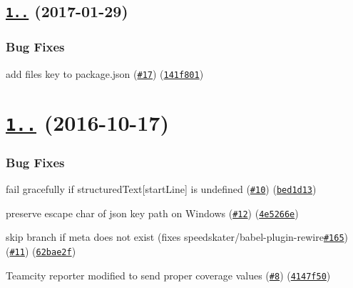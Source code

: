 \label{_1.0.1}%
 \subsection*{\href{https://github.com/istanbuljs/istanbul-reports/compare/v1.0.0...v1.0.1}{\tt 1..} (2017-\/01-\/29)}

\subsubsection*{Bug Fixes}


\begin{DoxyItemize}
\item add files key to package.\+json (\href{https://github.com/istanbuljs/istanbul-reports/issues/17}{\tt \#17}) (\href{https://github.com/istanbuljs/istanbul-reports/commit/141f801}{\tt 141f801})
\end{DoxyItemize}

\label{_1.0.0}%
 \section*{\href{https://github.com/istanbuljs/istanbul-reports/compare/v1.0.0-alpha.8...v1.0.0}{\tt 1..} (2016-\/10-\/17)}

\subsubsection*{Bug Fixes}


\begin{DoxyItemize}
\item fail gracefully if structured\+Text\mbox{[}start\+Line\mbox{]} is undefined (\href{https://github.com/istanbuljs/istanbul-reports/issues/10}{\tt \#10}) (\href{https://github.com/istanbuljs/istanbul-reports/commit/bed1d13}{\tt bed1d13})
\item preserve escape char of json key path on Windows (\href{https://github.com/istanbuljs/istanbul-reports/issues/12}{\tt \#12}) (\href{https://github.com/istanbuljs/istanbul-reports/commit/4e5266e}{\tt 4e5266e})
\item skip branch if meta does not exist (fixes speedskater/babel-\/plugin-\/rewire\href{https://github.com/istanbuljs/istanbul-reports/issues/165}{\tt \#165}) (\href{https://github.com/istanbuljs/istanbul-reports/issues/11}{\tt \#11}) (\href{https://github.com/istanbuljs/istanbul-reports/commit/62bae2f}{\tt 62bae2f})
\item Teamcity reporter modified to send proper coverage values (\href{https://github.com/istanbuljs/istanbul-reports/issues/8}{\tt \#8}) (\href{https://github.com/istanbuljs/istanbul-reports/commit/4147f50}{\tt 4147f50}) 
\end{DoxyItemize}